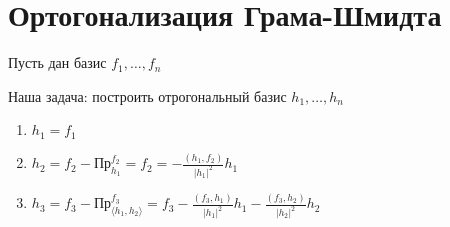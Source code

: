 \section{Ортогонализация Грама-Шмидта}

Пусть дан базис $f_1,\dots,f_n$

Наша задача: построить отрогональный базис $h_1,\dots,h_n$

\begin{enumerate}
    \item $h_1=f_1$
    \item $h_2=f_2 - \text{Пр}_{h_1}^{f_2} =f_2 =-\frac{(h_1,f_2)}{|h_1|^2}h_1$
    \item $h_3 = f_3 - \text{Пр}_{\langle h_1,h_2\rangle}^{f_3}=f_3 - \frac{(f_3,h_1)}{|h_1|^2}h_1 - \frac{(f_3,h_2)}{|h_2|^2}h_2 $
    \end{enumerate}